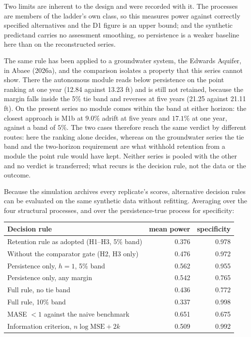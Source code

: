 \documentclass[11pt]{article}
\begin{document}
Two limits are inherent to the design and were recorded with it. The
processes are members of the ladder's own class, so this measures power
against correctly specified alternatives and the D1 figure is an upper
bound; and the synthetic predictand carries no assessment smoothing, so
persistence is a weaker baseline here than on the reconstructed series.

The same rule has been applied to a groundwater system, the Edwards
Aquifer, in Abaee (2026a), and the comparison isolates a property that
this series cannot show. There the autonomous module reads below
persistence on the point ranking at one year (12.84 against 13.23 ft)
and is still not retained, because the margin falls inside the 5\% tie
band and reverses at five years (21.25 against 21.11 ft). On the present
series no module comes within the band at either horizon: the closest
approach is M1b at \(9.0\%\) adrift at five years and \(17.1\%\) at one
year, against a band of \(5\%\). The two cases therefore reach the same verdict by
different routes: here the ranking alone decides, whereas on the
groundwater series the tie band and the two-horizon requirement are what
withhold retention from a module the point rule would have kept. Neither
series is pooled with the other and no verdict is transferred; what
recurs is the decision rule, not the data or the outcome.

Because the simulation archives every replicate's scores, alternative
decision rules can be evaluated on the same synthetic data without
refitting. Averaging over the four structural processes, and over the
persistence-true process for specificity:

\begin{longtable}[]{@{}lrr@{}}
\toprule\noalign{}
Decision rule & mean power & specificity \\
\midrule\noalign{}
\endhead
\bottomrule\noalign{}
\endlastfoot
Retention rule as adopted (H1--H3, 5\% band) & 0.376 & 0.978 \\
Without the comparator gate (H2, H3 only) & 0.476 & 0.972 \\
Persistence only, \(h=1\), 5\% band & 0.562 & 0.955 \\
Persistence only, any margin & 0.542 & 0.765 \\
Full rule, no tie band & 0.436 & 0.772 \\
Full rule, 10\% band & 0.337 & 0.998 \\
MASE \(<1\) against the naive benchmark & 0.651 & 0.675 \\
Information criterion, \(n\log\mathrm{MSE}+2k\) & 0.509 & 0.992 \\
\end{longtable}
\end{document}
